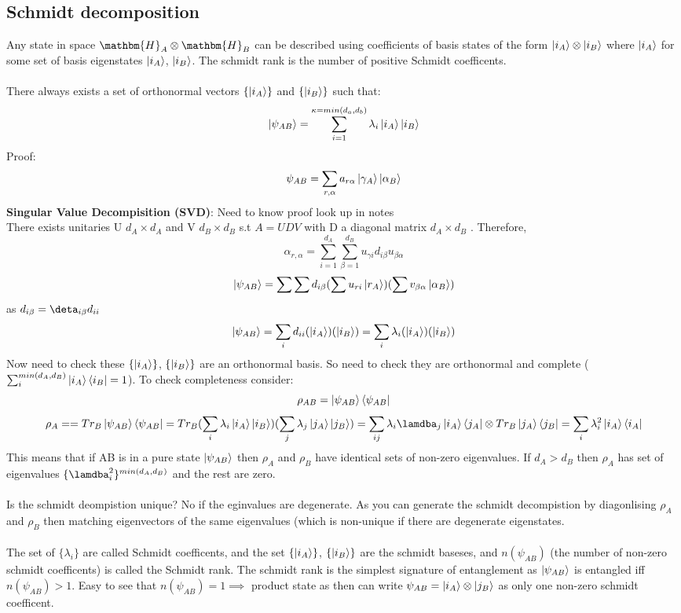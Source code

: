 \documentclass{article}
\begin{document}
\subsection{Schmidt decomposition}
Any state in space $\mathbm{H}_A \otimes \mathbm{H}_B $ can be described using coefficients of basis states of the form $\ket{i_A} \otimes \ket{i_B}$ where $\ket{i_A}$ for some set of basis eigenstates $\ket{i_A}$, $\ket{i_B}$. The schmidt rank is the number of positive Schmidt coefficents.\\\\
There always exists a set of orthonormal vectors $\{\ket{i_A}\}$ and $\{\ket{i_B}\}$ such that:
$$
\ket{\psi_{AB}} = \sum_{i=1}^{\kappa=min(d_a,d_b)} \lambda_i \ket{i_A}\ket{i_B}
$$
Proof:
$$
\psi_{AB} = \sum_{r,\alpha} a_{r\alpha} \ket{\gamma_A}\ket{\alpha_B}
$$
\textbf{Singular Value Decompisition (SVD)}: Need to know proof look up in notes\\
There exists unitaries U $d_A\times d_A$ and V $d_B \times d_B$ s.t $A = UDV$ with D a diagonal matrix $d_A \times d_B$ . Therefore,
$$
\alpha_{r,\alpha} = \sum_{i=1}^{d_A} \sum_{\beta=1}^{d_B} u_{\gamma i} d_{i \beta} u_{\beta \alpha}
$$
$$
\ket{\psi_{AB}} = \sum \sum d_{i\beta} (\sum u_{r i} \ket{r_A}) (\sum v_{\beta \alpha} \ket{\alpha_B})
$$
as $d_{i \beta} = \deta_{i \beta}d_{ii}$
$$
\ket{\psi_{AB}} = \sum_i d_{ii} (\ket{i_A}) (\ket{i_B}) = \sum_i \lambda_i (\ket{i_A}) (\ket{i_B}) 
$$
Now need to check these $\{\ket{i_A}\}$, $\{\ket{i_B}\}$ are an orthonormal basis. So need to check they are orthonormal and complete ($\sum^{min(d_A,d_B)}_i \ket{i_A}\bra{i_B} = 1$). To check completeness consider:
$$
\rho_{AB} =  \ket{\psi_{AB}} \bra{\psi_{AB}}
$$
$$
\rho_A =  = Tr_B \ket{\psi_{AB}} \bra{\psi_{AB}} = Tr_B (\sum_i \lambda_i \ket{i_A} \ket{i_B}) (\sum_j \lambda_j \ket{j_A} \ket{j_B}) = \sum_{ij} \lambda_i \lamdba_j \ket{i_A}\bra{j_A} \otimes Tr_B \ket{j_A} \bra{j_B} = \sum_i \lambda_i^2 \ket{i_A} \bra{i_A}
$$
This means that if AB is in a pure state $\ket{\psi_{AB}}$ then $\rho_A$ and $\rho_B$ have identical sets of non-zero eigenvalues. If $d_A >d_B$ then $\rho_A$ has set of eigenvalues $\{\lamdba_i^2\}^{min(d_A,d_B)}$ and the rest are zero.\\\\
Is the schmidt deompistion unique? No if the eginvalues are degenerate. As you can generate the schmidt decompistion by diagonlising $\rho_A$ and $\rho_B$ then matching eigenvectors of the same eigenvalues (which is non-unique if there are degenerate eigenstates.\\\\
The set of $\{\lambda_i\}$ are called Schmidt coefficents, and the set $\{\ket{i_A}\}$, $\{\ket{i_B}\}$ are the schmidt baseses, and $n(\psi_{AB})$ (the number of non-zero schmidt coefficents) is called the Schmidt rank. The schmidt rank is the simplest signature of entanglement as $\ket{\psi_{AB}}$ is entangled iff $n(\psi_{AB}) >1$. Easy to see that $n(\psi_{AB}) = 1 \implies$ product state as then can write $\psi_{AB} = \ket{i_A} \otimes \ket{j_B}$ as only one non-zero schmidt coefficent.
\end{document}
